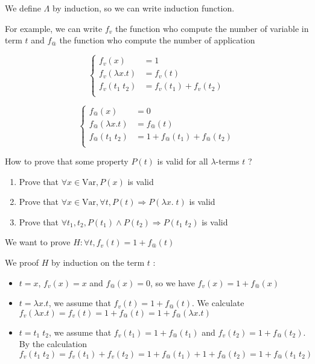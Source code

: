  We define $\Lambda$ by induction, so we can write induction function.

  For example, we can write $f_v$ the function who compute the number of
  variable in term $t$ and $f_@$ the function who compute the number of
  application
  \begin{multicols}{2}
    \[
        \begin{cases}
            f_v(x) &= 1 \\
            f_v(\lambda x. t) &= f_v(t) \\
            f_v(t_1\; t_2) &= f_v(t_1) + f_v(t_2) \\
        \end{cases}
    \]

    \[
        \begin{cases}
            f_@(x) &= 0 \\
            f_@(\lambda x. t) &= f_@(t) \\
            f_@(t_1\; t_2) &= 1 + f_@(t_1) + f_@(t_2) \\
        \end{cases}
    \]
  \end{multicols}

  How to prove that some property $P(t)$ is valid for all $\lambda$-terms $t$ ?

  \begin{enumerate}
    \item Prove that $\forall x \in \text{Var}, P(x)$ is valid
    \item Prove that $\forall x \in \text{Var}, \forall t, P(t) \Rightarrow
      P(\lambda x.\; t)$ is valid
    \item Prove that $\forall t_1, t_2, P(t_1) \wedge P(t_2) \Rightarrow P(t_1
      \; t_2)$ is valid
  \end{enumerate}

  \exam We want to prove $H : \forall t, f_v(t) = 1 + f_@(t) $

  \proof We proof $H$ by induction on the term $t$ :

  \begin{itemize}
    \item $t = x$, $f_v(x) = x$ and $f_@(x) = 0$, so we have $f_v(x) = 1 +
      f_@(x)$

    \item $t = \lambda x. t$, we assume that $f_v(t) = 1 + f_@(t)$.
      We calculate $f_v(\lambda x. t) = f_v(t) = 1 + f_@(t) = 1 + f_@(\lambda
      x.t)$

    \item $t = t_1\; t_2$, we assume that $f_v(t_1) = 1 + f_@(t_1)$ and
      $f_v(t_2) = 1 + f_@(t_2)$. By the calculation $f_v(t_1\; t_2) = f_v(t_1) +
      f_v(t_2) = 1 + f_@(t_1) + 1 + f_@(t_2) = 1 + f_@(t_1\; t_2)$
  \end{itemize}
  \qedsymbol

